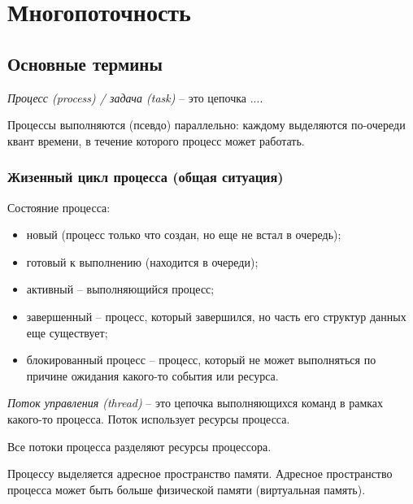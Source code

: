 \chapter{Многопоточность}

\section{Основные термины}

\begin{definition}[Процесс]
	\emph{Процесс (process) / задача (task)} -- это цепочка ....
\end{definition}

\begin{remark}
	Процессы выполняются (псевдо) параллельно: каждому выделяются по-очереди квант времени, в течение которого процесс может работать.
\end{remark}

\subsection{Жизенный цикл процесса (общая ситуация)}

Состояние процесса:
\begin{itemize}
	\item новый (процесс только что создан, но еще не встал в очередь);
	\item готовый к выполнению (находится в очереди);
	\item активный -- выполняющийся процесс;
	\item завершенный -- процесс, который завершился, но часть его структур данных еще существует;
	\item блокированный процесс -- процесс, который не может выполняться по причине ожидания какого-то события или ресурса.
\end{itemize}

\begin{definition}
	\emph{Поток управления (thread)} -- это цепочка выполняющихся команд в рамках какого-то процесса. Поток использует ресурсы процесса.

	Все потоки процесса разделяют ресурсы процессора.
\end{definition}

\begin{remark}
	Процессу выделяется адресное пространство памяти. Адресное пространство процесса может быть больше физической памяти (виртуальная память).
\end{remark}

